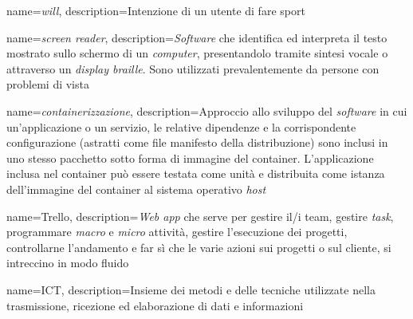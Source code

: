 {
    name={\textit{will}},
    description={Intenzione di un utente di fare sport}
}


{
    name={\textit{screen reader}},
    description={\textit{Software} che identifica ed interpreta il testo mostrato sullo schermo di un \textit{computer}, presentandolo tramite sintesi vocale o attraverso un \textit{display braille}. Sono utilizzati prevalentemente da persone con problemi di vista}
}



{
    name={\textit{containerizzazione}},
    description={Approccio allo sviluppo del \textit{software} in cui un'applicazione o un servizio, le relative dipendenze e la corrispondente configurazione (astratti come file manifesto della distribuzione) sono inclusi in uno stesso pacchetto sotto forma di immagine del \gls{container}. L'applicazione inclusa nel \gls{container} può essere testata come unità e distribuita come istanza dell'immagine del \gls{container} al sistema operativo \textit{host}}
}

{
    name={Trello},
    description={\textit{Web app} che serve per gestire il/i team, gestire \textit{task}, programmare \textit{macro} e \textit{micro} attività, gestire l'esecuzione dei progetti, controllarne l'andamento e far sì che le varie azioni sui progetti o sul cliente, si intreccino in modo fluido}
}

{
    name={ICT},
    description={Insieme dei metodi e delle tecniche utilizzate nella trasmissione, ricezione ed elaborazione di dati e informazioni}
}


